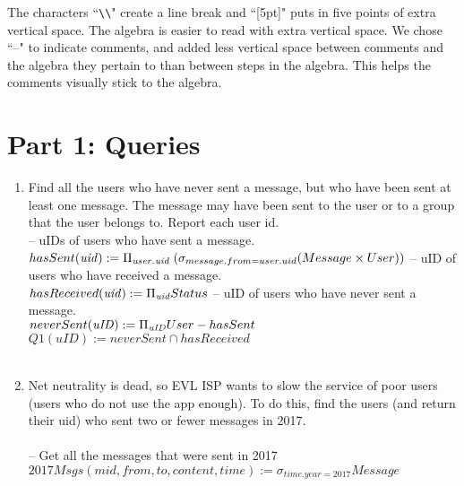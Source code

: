 \documentclass{article}
\newcommand{\var}[1]{\mathit{#1}}
\begin{document}
The characters ``\verb|\\|" create a line break and ``[5pt]" puts in 
five points of extra vertical space.  The algebra is easier to read with extra
vertical space.
We chose ``--" to indicate comments, and added less vertical space between comments
and the algebra they pertain to than between steps in the algebra.
This helps the comments visually stick to the algebra.


\section*{Part 1: Queries}

\begin{enumerate}

\item   %
Find all the users who have never sent a message, but who have been sent at least one message. The message may have been sent to the user or to a group that the user belongs to. Report each user id. \\

{\large %
\hspace*{1cm} --  uIDs of users who have sent a message. \\ [5pt]
$
hasSent(\var{uid}) :=
	\Pi_{\var{user.uid}}\;	%
	(\sigma_{message.from = user.uid} 
	(Message \times User)) \\[10pt]
$
\hspace*{1cm} -- uID of users who have received a message. \\[5pt]
$
hasReceived(\var{uid}) := 
	\Pi_{\var{uid}} 
	Status 
	\\[10pt]
$
\hspace*{1cm} -- uID of users who have never sent a message. \\[5pt]
$
neverSent(\var{uID}) := 
	\Pi_{\var{uID}} User - hasSent 
	\\[10pt]
$
$
Q1(\var{uID}) :=
	neverSent \cap hasReceived
$\\\\ %

} %


\item   %
Net neutrality is dead, so EVL ISP wants to slow the service of poor users (users who do not use the app enough). To do this, find the users (and return their uid) who sent two or fewer messages in 2017.\\\\
{\large
\hspace*{1cm} -- Get all the messages that were sent in 2017 \\ [5pt]
$
2017Msgs(\var{mid}, \var{from}, \var{to}, \var{content}, \var{time}) :=
	\sigma_{time.year = 2017} Message
$\\

}
\end{enumerate}
\end{document}

